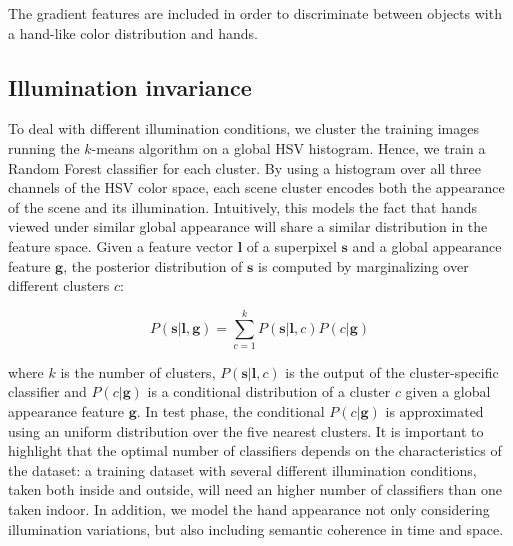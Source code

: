 The gradient features are included in order to discriminate between objects with a hand-like color distribution and hands.

\subsection{Illumination invariance}
To deal with different illumination conditions, we cluster the training images running the $k$-means algorithm on a global HSV histogram. Hence, we train a Random Forest classifier for each cluster. By using a histogram over all three channels of the HSV color space, each scene cluster encodes both the appearance of the scene and its illumination. Intuitively, this models the fact that hands viewed under similar global appearance will share a similar distribution in the feature space. Given a feature vector $\mathbf{l}$ of a superpixel $\mathbf{s}$ and a global appearance
feature $\mathbf{g}$, the posterior distribution of $\mathbf{s}$
is computed by marginalizing over different clusters $c$:

\begin{equation}
P(\mathbf{s}|\mathbf{l},\mathbf{g})=\sum_{c=1}^{k}P(\mathbf{s}|\mathbf{l},c)P(c|\mathbf{g})
\end{equation}


where $k$ is the number of clusters, $P(\mathbf{s}|\mathbf{l},c)$ is the output of the cluster-specific
classifier and $P(c|\mathbf{g})$ is a conditional distribution of a
cluster $c$ given a global appearance feature $\mathbf{g}$. In test
phase, the conditional $P(c|\mathbf{g})$ is approximated using an
uniform distribution over the five nearest clusters.
It is important to highlight that the optimal number of classifiers
depends on the characteristics of the dataset: a training dataset
with several different illumination conditions, taken both inside and
outside, will need an higher number of classifiers than one taken indoor.
In addition, we model the hand appearance not
only considering illumination variations, but also including semantic coherence in time and space.


